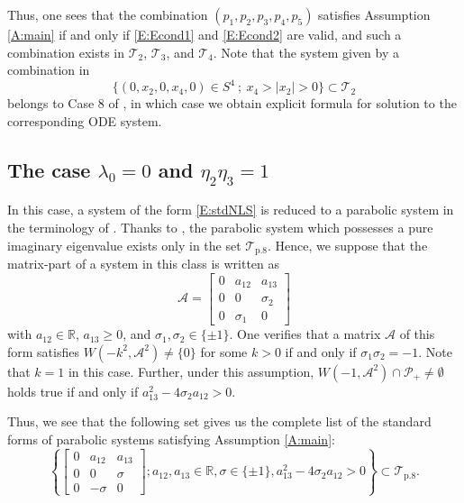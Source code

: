 \documentclass[11pt,a4paper,oneside]{amsart}
\theoremstyle{plain}
\theoremstyle{remark}
\numberwithin{equation}{section}
\newcommand{\R}{\mathbb{R}}
\def\ge{\geqslant}
\theoremstyle{definition}
\begin{document}
Thus, one sees that
the combination $(p_1,p_2,p_3,p_4,p_5)$
satisfies Assumption \ref{A:main} if and only 
if \eqref{E:Econd1} and \eqref{E:Econd2} are valid, and such a combination
exists in $\mathcal{T}_2$, $\mathcal{T}_3$, and $\mathcal{T}_4$.
Note that the system given by a combination in
\[
	\{ (0,x_2,0,x_4,0) \in S^4\ ;\ x_4>|x_2|>0 \}
\subset \mathcal{T}_2
\]
belongs to Case 8 of \cite{M3}, in which case we obtain explicit formula for solution to the corresponding ODE system.

\subsection{The case $\lambda_0=0$ and $\eta_2\eta_3=1$}
In this case, a system of the form \eqref{E:stdNLS} is reduced to a parabolic system in the terminology of \cite{M}.
Thanks to \cite[Theorem 1.11]{M},
the parabolic system which possesses a pure imaginary eigenvalue exists only in the set
$\mathcal{T}_{\mathrm{p}.8}$.
Hence, we suppose that
the matrix-part of a system in this class is written as
\begin{equation*}%
\mathscr{A}=	\begin{bmatrix}
	0 & a_{12} & a_{13} \\
	0 & 0 & \sigma_2 \\
	0 & \sigma_1 & 0
	\end{bmatrix}
\end{equation*}
with
$a_{12} \in \R$, $a_{13} \ge0$, and $\sigma_1,\sigma_2 \in \{\pm 1\}$.
One verifies that a matrix $\mathscr{A}$ of this form satisfies $W(-k^2,\mathscr{A}^2) \neq \{0\}$ for some $k>0$ if and only if
$\sigma_1 \sigma_2 = -1$.
Note that $k=1$ in this case. Further, under this assumption,
$W(-1, \mathscr{A}^2) \cap \mathcal{P}_+ \neq \emptyset $ holds true if and only if
$a_{13}^2 - 4 \sigma_2 a_{12} > 0$.

Thus, we see that the following set gives us the complete list of the standard forms of parabolic systems satisfying Assumption \ref{A:main}:
\[
	\left\{
	\begin{bmatrix}
	0 & a_{12} & a_{13} \\
	0 & 0 & \sigma \\
	0 & -\sigma & 0
	\end{bmatrix} ; a_{12},a_{13} \in \R, \sigma \in \{\pm 1\}
,a_{13}^2 - 4 \sigma_2 a_{12} >0
	\right\} \subset \mathcal{T}_{\mathrm{p}.8}.
\]
\end{document}
